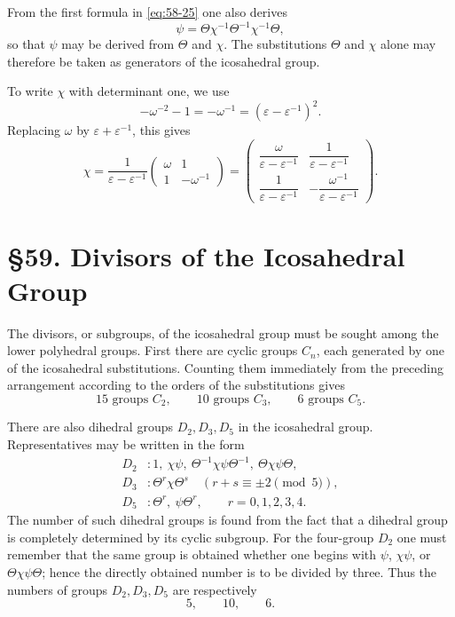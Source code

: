 \documentclass[11pt,a4paper]{book}
\newcommand{\webersection}[2]{\clearpage\section*{\S #1. #2}}
\newcommand{\eps}{\varepsilon}
\begin{document}
From the first formula in \eqref{eq:58-25} one also derives
\[
 \psi=\Theta\chi^{-1}\Theta^{-1}\chi^{-1}\Theta,
\]
so that \(\psi\) may be derived from \(\Theta\) and \(\chi\).  The substitutions \(\Theta\) and \(\chi\) alone may therefore be taken as generators of the icosahedral group.

To write \(\chi\) with determinant one, we use
\[
 -\omega^{-2}-1=-\omega^{-1}=(\eps-\eps^{-1})^2.
\]
Replacing \(\omega\) by \(\eps+\eps^{-1}\), this gives
\begin{equation}\label{eq:58-26}
 \chi=\frac1{\eps-\eps^{-1}}
 \begin{pmatrix}
 \omega&1\\
 1&-\omega^{-1}
 \end{pmatrix}
 =
 \begin{pmatrix}
 \dfrac{\omega}{\eps-\eps^{-1}}&\dfrac1{\eps-\eps^{-1}}\\[6pt]
 \dfrac1{\eps-\eps^{-1}}&-\dfrac{\omega^{-1}}{\eps-\eps^{-1}}
 \end{pmatrix}.
\end{equation}

\webersection{59}{Divisors of the Icosahedral Group}

The divisors, or subgroups, of the icosahedral group must be sought among the lower polyhedral groups.  First there are cyclic groups \(C_n\), each generated by one of the icosahedral substitutions.  Counting them immediately from the preceding arrangement according to the orders of the substitutions gives
\[
 15\text{ groups }C_2,
 \qquad 10\text{ groups }C_3,
 \qquad 6\text{ groups }C_5.
\]

There are also dihedral groups \(D_2,D_3,D_5\) in the icosahedral group.  Representatives may be written in the form
\begin{align*}
 D_2&:
 1,\ \chi\psi,\ \Theta^{-1}\chi\psi\Theta^{-1},\ \Theta\chi\psi\Theta,\\
 D_3&:
 \Theta^r\chi\Theta^s\quad(r+s\equiv\pm2\pmod5),\\
 D_5&:
 \Theta^r,\ \psi\Theta^r,
 \qquad r=0,1,2,3,4.
\end{align*}
The number of such dihedral groups is found from the fact that a dihedral group is completely determined by its cyclic subgroup.  For the four-group \(D_2\) one must remember that the same group is obtained whether one begins with \(\psi\), \(\chi\psi\), or \(\Theta\chi\psi\Theta\); hence the directly obtained number is to be divided by three.  Thus the numbers of groups \(D_2,D_3,D_5\) are respectively
\[
 5,
 \qquad 10,
 \qquad 6.
\]
\end{document}

